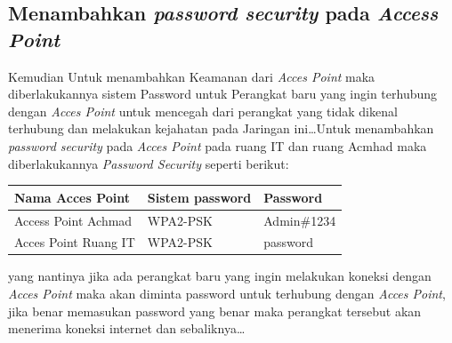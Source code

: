\documentclass[a4paper, 12pt]{article}
\begin{document}
\subsection{Menambahkan \textit{password security} pada \textit{Access Point}}
Kemudian Untuk menambahkan Keamanan dari \textit{Acces Point} maka diberlakukannya sistem Password untuk Perangkat baru yang ingin terhubung dengan \textit{Acces Point} untuk mencegah dari perangkat yang tidak dikenal terhubung dan melakukan kejahatan pada Jaringan ini\dots Untuk menambahkan \textit{password security} pada \textit{Acces Point} pada ruang IT dan ruang Acmhad maka diberlakukannya \textit{Password Security} seperti berikut:
\begin{table}[H]
  \begin{tabular}{|l|l|l|}
    \hline
    Nama Acces Point     & Sistem password & Password    \\ \hline
    Access Point Achmad  & WPA2-PSK        & Admin\#1234 \\ \hline
    Acces Point Ruang IT & WPA2-PSK        & password    \\ \hline
  \end{tabular}
\end{table}
yang nantinya jika ada perangkat baru yang ingin melakukan koneksi dengan \textit{Acces Point} maka akan diminta password untuk terhubung dengan \textit{Acces Point}, jika benar memasukan password yang benar maka perangkat tersebut akan menerima koneksi internet dan sebaliknya\dots
\end{document}
